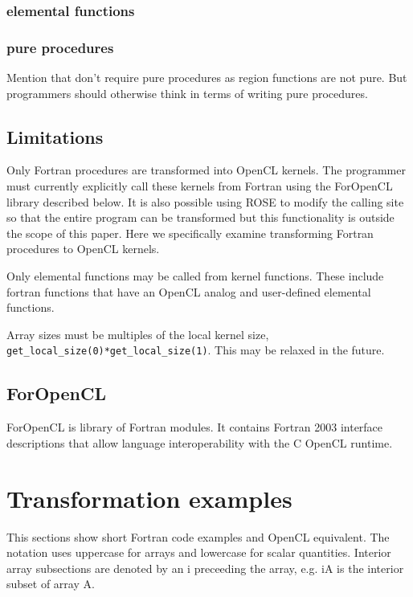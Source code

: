 \documentclass[10pt, conference, compsocconf]{IEEEtran}
\begin{document}
\subsubsection{elemental functions}

\subsubsection{pure procedures}

Mention that don't require pure procedures as region functions are not pure.
But programmers should otherwise think in terms of writing pure procedures.

\subsection{Limitations}

Only Fortran procedures are transformed into OpenCL kernels.  The programmer
must currently explicitly call these kernels from Fortran using the ForOpenCL
library described below.  It is also possible using ROSE to modify the calling
site so that the entire program can be transformed but this functionality is
outside the scope of this paper.  Here we specifically examine transforming
Fortran procedures to OpenCL kernels.

Only elemental functions may be called from kernel functions.  These include
fortran functions that have an OpenCL analog and user-defined elemental functions.

Array sizes must be multiples of the local kernel size,
{\tt get\_local\_size(0)*get\_local\_size(1)}.  This may be relaxed in the future.

\subsection{ForOpenCL}

ForOpenCL is library of Fortran modules.  It contains Fortran 2003 interface
descriptions that allow language interoperability with the C OpenCL runtime.

\section{Transformation examples}

This sections show short Fortran code examples and OpenCL equivalent.
The notation uses uppercase for arrays and lowercase for scalar quantities.
Interior array subsections are denoted by an i preceeding the array, e.g. iA
is the interior subset of array A.
\end{document}
